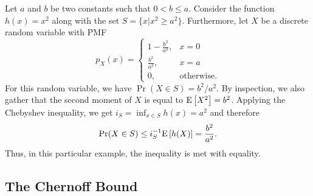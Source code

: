 \begin{example}
Let $a$ and $b$ be two constants such that $0 < b \leq a$.
Consider the function $h(x) = x^2$ along with the set $S = \{ x | x^2 \geq a^2 \}$.
Furthermore, let $X$ be a discrete random variable with PMF
\begin{equation*}
p_X (x) = \begin{cases} 1 - \frac{b^2}{a^2}, & x = 0 \\
\frac{b^2}{a^2}, & x = a \\
0, & \text{otherwise}. \end{cases}
\end{equation*}
For this random variable, we have $\Pr (X \in S) = b^2/a^2$.
By inspection, we also gather that the second moment of $X$ is equal to $\mathrm{E} \left[ X^2 \right] = b^2$.
Applying the Chebyshev inequality, we get $i_S = \inf_{x \in S} h(x) = a^2$ and therefore
\begin{equation*}
\Pr (X \in S) \leq i_S^{-1} \mathrm{E} \left[ h(X) \right]
= \frac{b^2}{a^2} .
\end{equation*}
Thus, in this particular example, the inequality is met with equality.
\end{example}


\subsection{The Chernoff Bound}

